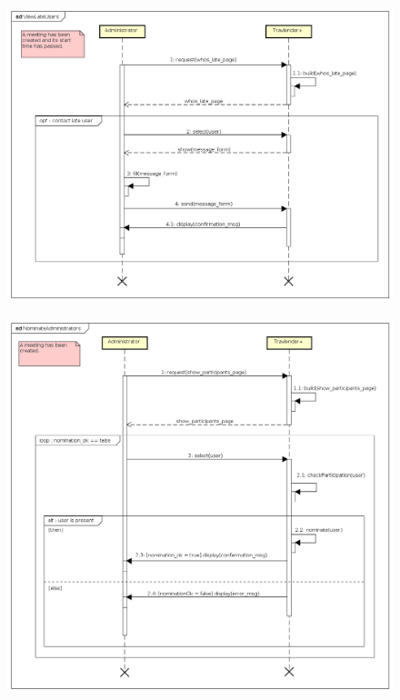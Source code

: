 \begin{figure}[!h]
\centering\includegraphics[width=\textwidth]{Images/SequenceDiagrams/Admin/ViewLateUsers.png}{}
\caption{}
\end{figure}

\begin{figure}[!h]
\centering\includegraphics[width=\textwidth]{Images/SequenceDiagrams/Admin/NominateAdministrators.png}{}
\caption{}
\end{figure}


